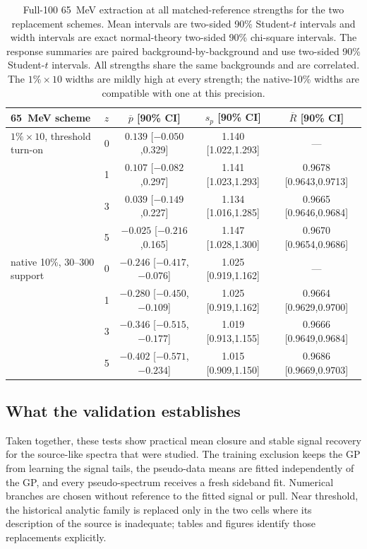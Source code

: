 \begin{table}[htbp]
\centering
\small
\begin{tabular}{llccc}
\toprule
65~MeV scheme & $z$ & $\overline p$ [90\% CI] & $s_p$ [90\% CI] & $\overline R$ [90\% CI] \\
\midrule
$1\%\times10$, threshold turn-on & 0 & $0.139$ [$-0.050$,0.329] & 1.140 [1.022,1.293] & --- \\
 & 1 & $0.107$ [$-0.082$,0.297] & 1.141 [1.023,1.293] & 0.9678 [0.9643,0.9713] \\
 & 3 & $0.039$ [$-0.149$,0.227] & 1.134 [1.016,1.285] & 0.9665 [0.9646,0.9684] \\
 & 5 & $-0.025$ [$-0.216$,0.165] & 1.147 [1.028,1.300] & 0.9670 [0.9654,0.9686] \\
\addlinespace
native 10\%, 30--300 support & 0 & $-0.246$ [$-0.417$,$-0.076$] & 1.025 [0.919,1.162] & --- \\
 & 1 & $-0.280$ [$-0.450$,$-0.109$] & 1.025 [0.919,1.162] & 0.9664 [0.9629,0.9700] \\
 & 3 & $-0.346$ [$-0.515$,$-0.177$] & 1.019 [0.913,1.155] & 0.9666 [0.9649,0.9684] \\
 & 5 & $-0.402$ [$-0.571$,$-0.234$] & 1.015 [0.909,1.150] & 0.9686 [0.9669,0.9703] \\
\bottomrule
\end{tabular}
\caption{Full-100 65~MeV extraction at all matched-reference strengths for the two
replacement schemes.  Mean intervals are two-sided 90\% Student-$t$ intervals and
width intervals are exact normal-theory two-sided 90\% chi-square intervals.  The
response summaries are paired background-by-background and use two-sided 90\%
Student-$t$ intervals.  All strengths share the same backgrounds and are correlated.  The
$1\%\times10$ widths are mildly high at every strength; the native-10\% widths are
compatible with one at this precision.}
\label{tab:v491-injection-recovery}
\end{table}

\subsection{What the validation establishes}

Taken together, these tests show practical mean closure and stable signal recovery for
the source-like spectra that were studied.  The training exclusion keeps the GP from
learning the signal tails, the pseudo-data means are fitted independently of the GP,
and every pseudo-spectrum receives a fresh sideband fit.  Numerical branches are
chosen without reference to the fitted signal or pull.  Near threshold, the historical
analytic family is replaced only in the two cells where its description of the source
is inadequate; tables and figures identify those replacements explicitly.

